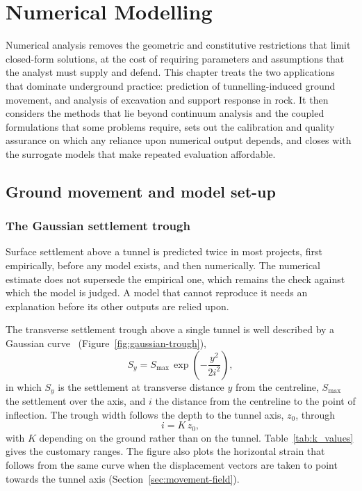 \chapter{Numerical Modelling}
\label{ch:numerical-modelling}

Numerical analysis removes the geometric and constitutive restrictions that
limit closed-form solutions, at the cost of requiring parameters and
assumptions that the analyst must supply and defend. This chapter treats the
two applications that dominate underground practice: prediction of
tunnelling-induced ground movement, and analysis of excavation and support
response in rock. It then considers the methods that lie beyond continuum
analysis and the coupled formulations that some problems require, sets out
the calibration and quality assurance on which any reliance upon numerical
output depends, and closes with the surrogate models that make repeated
evaluation affordable.

\section{Ground movement and model set-up}
\label{sec:ground-movement-and-model-set-up}

\subsection{The Gaussian settlement trough}
\label{sec:gaussian-trough}

Surface settlement above a tunnel is predicted twice in most projects, first
empirically, before any model exists, and then numerically. The numerical
estimate does not supersede the empirical one, which remains the check
against which the model is judged. A model that cannot reproduce it needs
an explanation before its other outputs are relied upon.

The transverse settlement trough above a single tunnel is well described by a
Gaussian curve~\citep{peck1969deep} (Figure~\ref{fig:gaussian-trough}),
\[
S_y = S_{\max} \, \exp\!\left(-\frac{y^2}{2i^2}\right),
\]
in which $S_y$ is the settlement at transverse distance $y$ from the
centreline, $S_{\max}$ the settlement over the axis, and $i$ the distance
from the centreline to the point of inflection. The trough width follows the
depth to the tunnel axis, $z_0$, through
\[
i = K \, z_0 ,
\]
with $K$ depending on the ground rather than on the tunnel. Table~\ref{tab:k_values}
gives the customary ranges. The figure also plots the horizontal strain that
follows from the same curve when the displacement vectors are taken to point
towards the tunnel axis (Section~\ref{sec:movement-field}).

